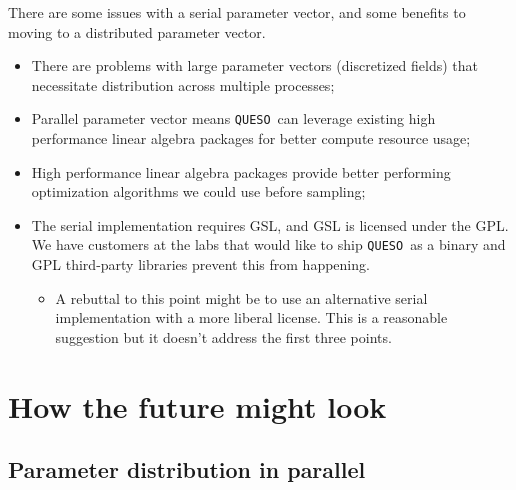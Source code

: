 \documentclass{article}
\newcommand{\Queso}{\texttt{QUESO}}
\begin{document}
There are some issues with a serial parameter vector, and some benefits to
moving to a distributed parameter vector.
\begin{itemize}
  \item There are problems with large parameter vectors (discretized fields)
    that necessitate distribution across multiple processes;
  \item Parallel parameter vector means \Queso\ can leverage existing high
    performance linear algebra packages for better compute resource usage;
  \item High performance linear algebra packages provide better performing
    optimization algorithms we could use before sampling;
  \item The serial implementation requires GSL, and GSL is licensed under the
    GPL.  We have customers at the labs that would like to ship \Queso\ as a
    binary and GPL third-party libraries prevent this from happening.
    \begin{itemize}
      \item A rebuttal to this point might be to use an alternative serial
        implementation with a more liberal license.  This is a reasonable
        suggestion but it doesn't address the first three points.
    \end{itemize}
\end{itemize}

\section{How the future might look}
\subsection{Parameter distribution in parallel}
\end{document}
